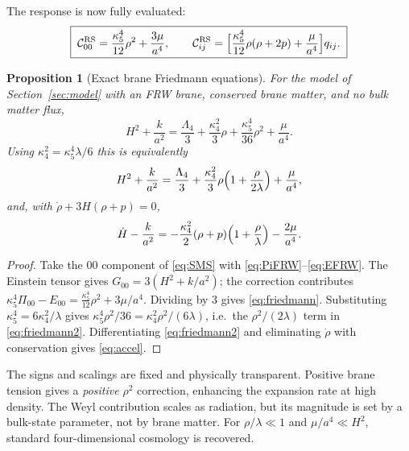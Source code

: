 \documentclass[11pt,a4paper]{article}
\theoremstyle{plain}
\newtheorem{proposition}[theorem]{Proposition}
\theoremstyle{definition}
\newcommand{\kfive}{\kappa_5}
\newcommand{\kfour}{\kappa_4}
\newcommand{\Lfour}{\Lambda_4}
\newcommand{\RS}{\mathrm{RS}}
\begin{document}
The response is now fully evaluated:
\begin{equation}
\label{eq:CFRW}
\boxed{\;
\mathcal C^{\RS}_{00}
=\frac{\kfive^4}{12}\rho^2+\frac{3\mu}{a^4},
\qquad
\mathcal C^{\RS}_{ij}
=\Bigl[\frac{\kfive^4}{12}\rho(\rho+2p)+\frac{\mu}{a^4}\Bigr]q_{ij}.
\;}
\end{equation}

\begin{proposition}[Exact brane Friedmann equations]
\label{prop:friedmann}
For the model of Section~\ref{sec:model} with an FRW brane, conserved
brane matter, and no bulk matter flux,
\begin{equation}
\label{eq:friedmann}
\boxed{\;
H^2+\frac{k}{a^2}
=\frac{\Lfour}{3}
+\frac{\kfour^2}{3}\rho
+\frac{\kfive^4}{36}\rho^2
+\frac{\mu}{a^4}.
\;}
\end{equation}
Using $\kfour^2=\kfive^4\lambda/6$ this is equivalently
\begin{equation}
\label{eq:friedmann2}
H^2+\frac{k}{a^2}
=\frac{\Lfour}{3}
+\frac{\kfour^2}{3}\rho\Bigl(1+\frac{\rho}{2\lambda}\Bigr)
+\frac{\mu}{a^4},
\end{equation}
and, with $\dot\rho+3H(\rho+p)=0$,
\begin{equation}
\label{eq:accel}
\dot H-\frac{k}{a^2}
=-\frac{\kfour^2}{2}(\rho+p)\Bigl(1+\frac{\rho}{\lambda}\Bigr)
-\frac{2\mu}{a^4}.
\end{equation}
\end{proposition}

\begin{proof}
Take the $00$ component of \eqref{eq:SMS} with
\eqref{eq:PiFRW}--\eqref{eq:EFRW}. The Einstein tensor gives
$G_{00}=3(H^2+k/a^2)$; the correction contributes
$\kfive^4\Pi_{00}-E_{00}
=\tfrac{\kfive^4}{12}\rho^2+3\mu/a^4$. Dividing by $3$ gives
\eqref{eq:friedmann}. Substituting
$\kfive^4=6\kfour^2/\lambda$ gives
$\kfive^4\rho^2/36=\kfour^2\rho^2/(6\lambda)$, i.e.\
the $\rho^2/(2\lambda)$ term in \eqref{eq:friedmann2}. Differentiating
\eqref{eq:friedmann2} and eliminating $\dot\rho$ with conservation gives
\eqref{eq:accel}.
\end{proof}

The signs and scalings are fixed and physically transparent. Positive
brane tension gives a \emph{positive} $\rho^2$ correction, enhancing the
expansion rate at high density. The Weyl contribution scales as
radiation, but its magnitude is set by a bulk-state parameter, not by
brane matter. For $\rho/\lambda\ll1$ and $\mu/a^4\ll H^2$, standard
four-dimensional cosmology is recovered.
\end{document}

